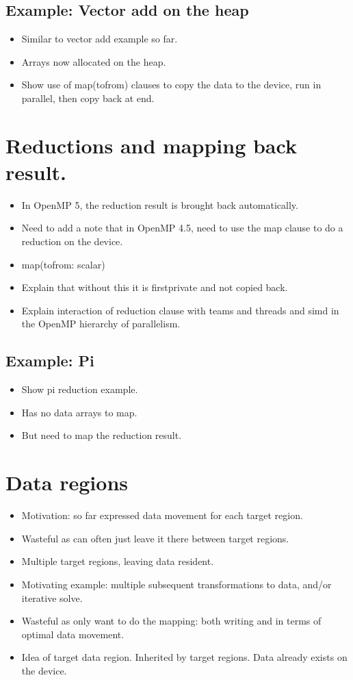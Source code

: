 \subsection{Example: Vector add on the heap}
\begin{itemize}
  \item Similar to vector add example so far.
  \item Arrays now allocated on the heap.
  \item Show use of map(tofrom) clauses to copy the data to the device, run in parallel, then copy back at end.
\end{itemize}
\section{Reductions and mapping back result.}
\begin{itemize}
  \item In OpenMP 5, the reduction result is brought back automatically.
  \item Need to add a note that in OpenMP 4.5, need to use the map clause to do a reduction on the device.
  \item map(tofrom: scalar)
  \item Explain that without this it is firstprivate and not copied back.
  \item Explain interaction of reduction clause with teams and threads and simd in the OpenMP hierarchy of parallelism.
\end{itemize}

\subsection{Example: Pi}
\begin{itemize}
  \item Show pi reduction example.
  \item Has no data arrays to map.
  \item But need to map the reduction result.
\end{itemize}

\section{Data regions}
\begin{itemize}
  \item Motivation: so far expressed data movement for each target region.
  \item Wasteful as can often just leave it there between target regions.
  \item Multiple target regions, leaving data resident.
  \item Motivating example: multiple subsequent transformations to data, and/or iterative solve.
  \item Wasteful as only want to do the mapping: both writing and in terms of optimal data movement.
  \item Idea of target data region. Inherited by target regions. Data already exists on the device.
\end{itemize}

